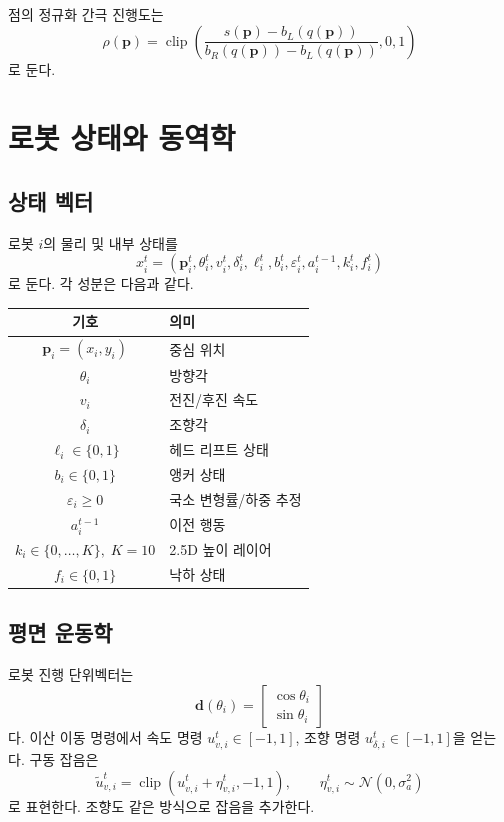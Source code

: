 \documentclass[11pt,a4paper]{article}
\newcommand{\clip}{\operatorname{clip}}
\begin{document}
점의 정규화 간극 진행도는
\begin{equation}
  \rho(\bm{p})=
  \clip\!\left(
    \frac{s(\bm{p})-b_L(q(\bm{p}))}
         {b_R(q(\bm{p}))-b_L(q(\bm{p}))},
    0,1
  \right)
  \label{eq:point-progress}
\end{equation}
로 둔다.

\section{로봇 상태와 동역학}

\subsection{상태 벡터}

로봇 \(i\)의 물리 및 내부 상태를
\begin{equation}
  x_i^t=
  \left(
    \bm{p}_i^t,\theta_i^t,v_i^t,\delta_i^t,
    \ell_i^t,b_i^t,\varepsilon_i^t,
    a_i^{t-1},k_i^t,f_i^t
  \right)
\end{equation}
로 둔다. 각 성분은 다음과 같다.

\begin{center}
\begin{tabular}{cl}
\toprule
기호 & 의미\\
\midrule
\(\bm{p}_i=(x_i,y_i)\) & 중심 위치\\
\(\theta_i\) & 방향각\\
\(v_i\) & 전진/후진 속도\\
\(\delta_i\) & 조향각\\
\(\ell_i\in\{0,1\}\) & 헤드 리프트 상태\\
\(b_i\in\{0,1\}\) & 앵커 상태\\
\(\varepsilon_i\ge0\) & 국소 변형률/하중 추정\\
\(a_i^{t-1}\) & 이전 행동\\
\(k_i\in\{0,\ldots,K\},\;K=10\) & 2.5D 높이 레이어\\
\(f_i\in\{0,1\}\) & 낙하 상태\\
\bottomrule
\end{tabular}
\end{center}

\subsection{평면 운동학}

로봇 진행 단위벡터는
\begin{equation}
  \bm{d}(\theta_i)=
  \begin{bmatrix}
    \cos\theta_i\\ \sin\theta_i
  \end{bmatrix}
\end{equation}
다. 이산 이동 명령에서 속도 명령 \(u_{v,i}^t\in[-1,1]\), 조향 명령 \(u_{\delta,i}^t\in[-1,1]\)을 얻는다. 구동 잡음은
\begin{equation}
  \widetilde{u}_{v,i}^t
  =\clip(u_{v,i}^t+\eta_{v,i}^t,-1,1),
  \qquad
  \eta_{v,i}^t\sim\mathcal{N}(0,\sigma_a^2)
\end{equation}
로 표현한다. 조향도 같은 방식으로 잡음을 추가한다.
\end{document}
